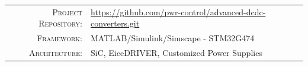 \documentclass[12pt, a4paper]{article}
\newcommand{\MetaLabelA}{Project Repository}
\newcommand{\MetaValueA}{https://github.com/pwr-control/advanced-dcdc-converters.git}
\newcommand{\MetaLabelB}{Framework}
\newcommand{\MetaValueB}{MATLAB/Simulink/Simscape - STM32G474}
\newcommand{\MetaLabelC}{Architecture}
\newcommand{\MetaValueC}{SiC, EiceDRIVER, Customized Power Supplies}
\begin{document}
\vfill

\noindent
\begin{tabular}{@{} r @{\quad} l @{}}
    \textsc{\small\MetaLabelA:} & {\small\url{\MetaValueA}} \\[3pt]
    \textsc{\small\MetaLabelB:} & {\small\MetaValueB}       \\[3pt]
    \textsc{\small\MetaLabelC:} & {\small\MetaValueC}       \\
\end{tabular}

\newpage
{}
\setcounter{page}{1}

\end{document}
